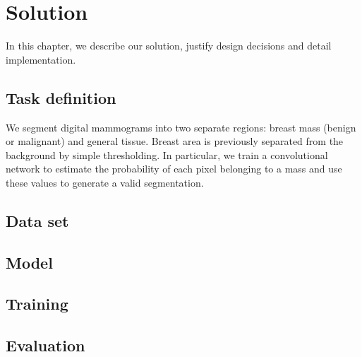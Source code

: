 \chapter{Solution}
\label{ch:Model}

In this chapter, we describe our solution, justify design decisions and detail implementation.



\section{Task definition}
We segment digital mammograms into two separate regions: breast mass (benign or malignant) and general tissue.
Breast area is previously separated from the background by simple thresholding.
In particular, we train a convolutional network to estimate the probability of each pixel belonging to a mass and use these values to generate a valid segmentation.


\section{Data set}


\section{Model}


\section{Training}


\section{Evaluation}

